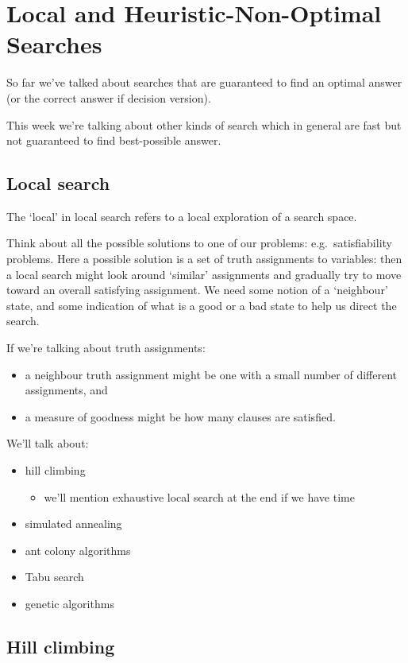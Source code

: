 \documentclass[11pt]{article}
\begin{document}
\section{Local and Heuristic-Non-Optimal Searches}

So far we've talked about searches that are guaranteed to find an optimal answer (or the correct answer if decision version).

This week we're talking about other kinds of search which in general are fast but not guaranteed to find best-possible answer.

\subsection{Local search}

The `local' in local search refers to a local exploration of a search space.

Think about all the possible solutions to one of our problems: e.g.\ satisfiability problems. Here a possible solution is a set of truth assignments to variables: then a local search might look around `similar' assignments and gradually try to move toward an overall satisfying assignment. We need some notion of a `neighbour' state, and some indication of what is a good or a bad state to help us direct the search.

If we're talking about truth assignments:
\begin{itemize}
    \item a neighbour truth assignment might be one with a small number of different assignments, and
    \item a measure of goodness might be how many clauses are satisfied.
\end{itemize}

We'll talk about:
\begin{itemize}
    \item hill climbing
    \begin{itemize}
        \item we'll mention exhaustive local search at the end if we have time
    \end{itemize}
    \item simulated annealing
    \item ant colony algorithms
    \item Tabu search
    \item genetic algorithms
\end{itemize}

\subsection{Hill climbing}
\end{document}
